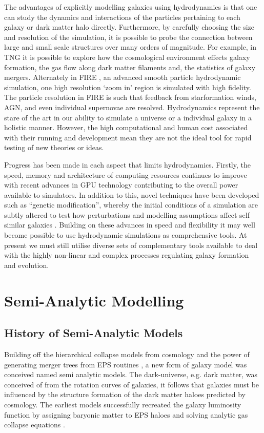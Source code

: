 The advantages of explicitly modelling galaxies using hydrodynamics is that one can study the dynamics and interactions of the particles pertaining to each galaxy or dark matter halo directly. Furthermore, by carefully choosing the size and resolution of the simulation, it is possible to probe the connection between large and small scale structures over many orders of magnitude. For example, in TNG it is possible to explore how the cosmological environment effects galaxy formation, the gas flow along dark matter filaments and, the statistics of galaxy mergers. 
Alternately in FIRE \cite{Hopkins2018FIRE-2Formation}, an advanced smooth particle hydrodynamic simulation, one high resolution `zoom in' region is simulated with high fidelity. The particle resolution in FIRE is such that feedback from starformation winds, AGN, and even individual supernovae are resolved. Hydrodynamics represent the stare of the art in our ability to simulate a universe or a individual galaxy in a holistic manner. However, the high computational and human cost associated with their running and development mean they are not the ideal tool for rapid testing of new theories or ideas. 

Progress has been made in each aspect that limits hydrodynamics. Firstly, the speed, memory and architecture of computing resources continues to improve with recent advances in GPU technology contributing to the overall power available to simulators. In addition to this, novel techniques have been developed such as ``genetic modification'', whereby the initial conditions of a simulation are subtly altered to test how perturbations and modelling assumptions affect self similar galaxies \citep{Pontzen2017HowGalaxy}. Building on these advances in speed and flexibility it may well become possible to use hydrodynamic simulations as comprehensive tools. At present we must still utilise diverse sets of complementary tools available to deal with the highly non-linear and complex processes regulating galaxy formation and evolution.

\section{Semi-Analytic Modelling}
\label{sec:SAM}
\subsection{History of Semi-Analytic Models}
Building off the hierarchical collapse models from \LCDM cosmology and the power of generating merger trees from EPS routines \citep{Press1974}, a new form of galaxy model was conceived named semi analytic models. The dark-universe, e.g. dark matter, was conceived of from the rotation curves of galaxies, it follows that galaxies must be influenced by the structure formation of the dark matter haloes predicted by \LCDM cosmology. The earliest models successfully recreated the galaxy luminosity function by assigning baryonic matter to EPS haloes and solving analytic gas collapse equations \citep{White1978CoreClustering}.

